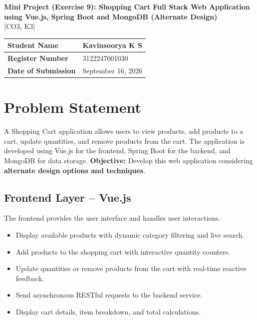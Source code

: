 \documentclass[11pt,a4paper]{article}
\begin{document}
\begin{center}
    {\Large \textbf{Mini Project (Exercise 9): Shopping Cart Full Stack Web Application}}\\[0.5em]
    {\Large \textbf{using Vue.js, Spring Boot and MongoDB (Alternate Design)}}\\[0.5em]
    {\normalsize [CO3, K3]}\\[1.5em]
    
    \begin{tabular}{|l|l|}
        \hline
        \textbf{Student Name} & Kavinsoorya K S \\
        \hline
        \textbf{Register Number} & 3122247001030 \\
        \hline
        \textbf{Date of Submission} & September 16, 2026 \\
        \hline
    \end{tabular}
\end{center}

\vspace{1.5em}

\section{Problem Statement}
A Shopping Cart application allows users to view products, add products to a cart, update quantities, and remove products from the cart. The application is developed using Vue.js for the frontend, Spring Boot for the backend, and MongoDB for data storage.
\textbf{Objective:} Develop this web application considering \textbf{alternate design options and techniques}.

\subsection*{Frontend Layer -- Vue.js}
The frontend provides the user interface and handles user interactions.
\begin{itemize}
    \item Display available products with dynamic category filtering and live search.
    \item Add products to the shopping cart with interactive quantity counters.
    \item Update quantities or remove products from the cart with real-time reactive feedback.
    \item Send asynchronous RESTful requests to the backend service.
    \item Display cart details, item breakdown, and total calculations.
\end{itemize}
\end{document}
